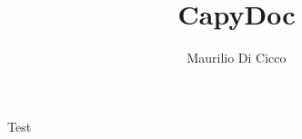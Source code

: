 \documentclass[10pt,a4paper]{report}
\author{Maurilio Di Cicco}
\title{CapyDoc}
\begin{document}
Test
\end{document}
